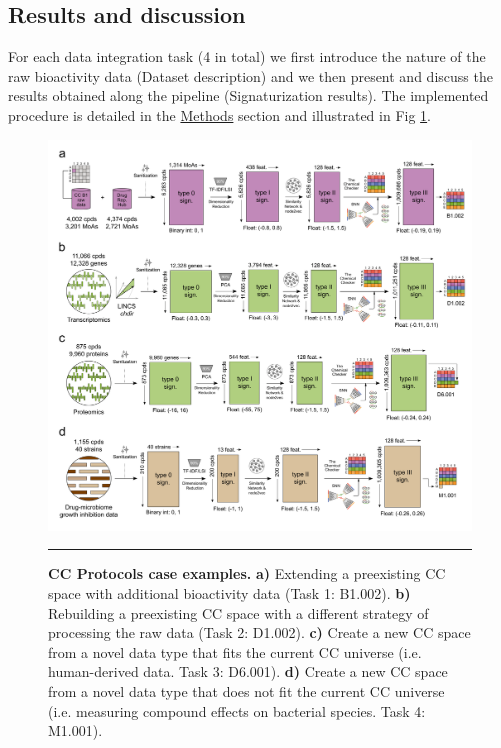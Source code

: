 \subsection{Results and discussion}


For each data integration task (4 in total) we first introduce the nature of the raw bioactivity data (Dataset description) and we then present and discuss the results obtained along the pipeline (Signaturization results). The implemented procedure is detailed in the \hyperref[Protocols_Methods]{Methods} section and illustrated in Fig \ref{Protocols_Fig2}.



\begin{figure}[t!]
  \centering
  \includegraphics[width=\linewidth]{figures/Protocols/Main/Pipeline_v6.png}
  \caption{
    \textbf{CC Protocols case examples.} 
    \textbf{a)} Extending a preexisting CC space with additional bioactivity data (Task 1: B1.002).
    \textbf{b)} Rebuilding a preexisting CC space with a different strategy of processing the raw data (Task 2: D1.002).
    \textbf{c)} Create a new CC space from a novel data type that fits the current CC universe (i.e. human-derived data. Task 3: D6.001). 
    \textbf{d)} Create a new CC space from a novel data type that does not fit the current CC universe (i.e. measuring compound effects on bacterial species. Task 4: M1.001).
  }
  \rule[0ex]{\textwidth}{0.5pt}
  \vspace{-5mm}
  \label{Protocols_Fig2}
\end{figure}


